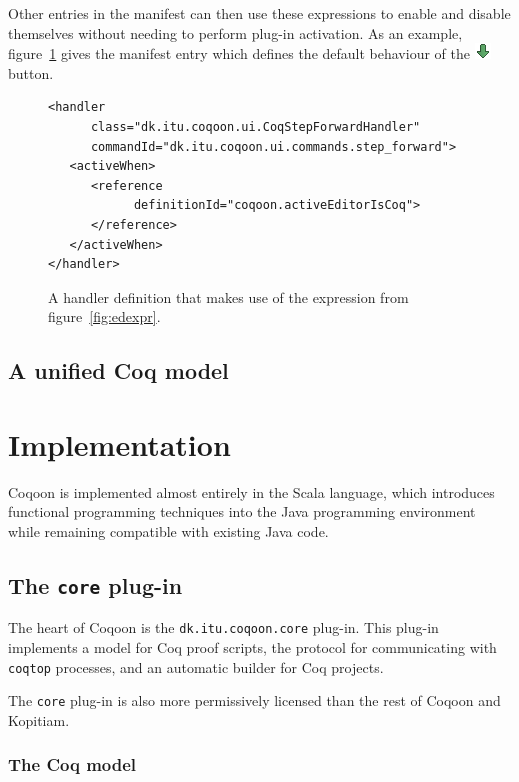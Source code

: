 \documentclass{article}
\begin{document}
Other entries in the manifest can then use these expressions to enable and
disable themselves without needing to perform plug-in activation. As an
example, figure~\ref{fig:fwdhandler} gives the manifest entry which defines the
default behaviour of the \includegraphics[scale=0.5]{down.png} button.

\begin{figure}[h]
\begin{lstlisting}[basicstyle=\footnotesize\ttfamily]
<handler
      class="dk.itu.coqoon.ui.CoqStepForwardHandler"
      commandId="dk.itu.coqoon.ui.commands.step_forward">
   <activeWhen>
      <reference
            definitionId="coqoon.activeEditorIsCoq">
      </reference>
   </activeWhen>
</handler>
\end{lstlisting}
\caption{A handler definition that makes use of the expression from
figure~\ref{fig:edexpr}.}
\label{fig:fwdhandler}
\end{figure}

\subsection{A unified Coq model}

\pagebreak

\section{Implementation}

Coqoon is implemented almost entirely in the Scala language, which introduces
functional programming techniques into the Java programming environment while
remaining compatible with existing Java code.

\subsection{The \texttt{core} plug-in}

The heart of Coqoon is the \texttt{dk.itu.coqoon.core} plug-in. This plug-in
implements a model for Coq proof scripts, the protocol for communicating with
\texttt{coqtop} processes, and an automatic builder for Coq projects.

The \texttt{core} plug-in is also more permissively licensed than the rest of
Coqoon and Kopitiam.

\subsubsection{The Coq model}
\end{document}
